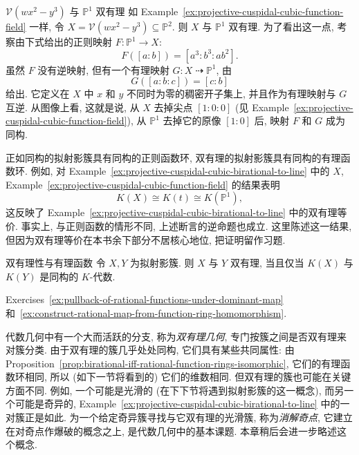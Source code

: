 \begin{Example}{$\mathcal{V}(wx^{2}-y^{3})$ 与 $\mathbb{P}^{1}$ 双有理}\leavevmode\label{ex:projective-cuspidal-cubic-birational-to-line}
如 Example~\ref{ex:projective-cuspidal-cubic-function-field} 一样, 令 $X=\mathcal{V}(wx^{2}-y^{3})\subseteq\mathbb{P}^{2}$. 则 $X$ 与 $\mathbb{P}^{1}$ 双有理. 为了看出这一点, 考察由下式给出的正则映射 $F:\mathbb{P}^{1}\to X$:
\[
  F([a:b])=[a^{3}:b^{3}:ab^{2}].
\]
虽然 $F$ 没有逆映射, 但有一个有理映射 $G:X\mathrel{\rightdasharrow}\mathbb{P}^{1}$, 由
\[
  G([a:b:c])=[c:b]
\]
给出. 它定义在 $X$ 中 $x$ 和 $y$ 不同时为零的稠密开子集上, 并且作为有理映射与 $G$ 互逆. 从图像上看, 这就是说, 从 $X$ 去掉尖点 $[1:0:0]$ (见 Example~\ref{ex:projective-cuspidal-cubic-function-field}), 从 $\mathbb{P}^{1}$ 去掉它的原像 $[1:0]$ 后, 映射 $F$ 和 $G$ 成为同构.
\end{Example}

正如同构的拟射影簇具有同构的正则函数环, 双有理的拟射影簇具有同构的有理函数环. 例如, 对 Example~\ref{ex:projective-cuspidal-cubic-birational-to-line} 中的 $X$, Example~\ref{ex:projective-cuspidal-cubic-function-field} 的结果表明
\[
  K(X)\cong K(t)\cong K(\mathbb{P}^{1}),
\]
这反映了 Example~\ref{ex:projective-cuspidal-cubic-birational-to-line} 中的双有理等价. 事实上, 与正则函数的情形不同, 上述断言的逆命题也成立. 这里陈述这一结果, 但因为双有理等价在本书余下部分不居核心地位, 把证明留作习题.

\begin{Proposition}{双有理性与有理函数}\leavevmode\label{prop:birational-iff-rational-function-rings-isomorphic}
令 $X,Y$ 为拟射影簇. 则 $X$ 与 $Y$ 双有理, 当且仅当 $K(X)$ 与 $K(Y)$ 是同构的 $K$-代数.
\end{Proposition}
\begin{Proof}
Exercises~\ref{ex:pullback-of-rational-functions-under-dominant-map} 和~\ref{ex:construct-rational-map-from-function-ring-homomorphism}.
\end{Proof}

代数几何中有一个大而活跃的分支, 称为\emph{双有理几何}, 专门按簇之间是否双有理来对簇分类. 由于双有理的簇\textquotedbl{}几乎处处\textquotedbl{}同构, 它们具有某些共同属性: 由 Proposition~\ref{prop:birational-iff-rational-function-rings-isomorphic}, 它们的有理函数环相同, 所以 (如下一节将看到的) 它们的维数相同. 但双有理的簇也可能在关键方面不同. 例如, 一个可能是光滑的 (在下下节将遇到拟射影簇的这一概念), 而另一个可能是奇异的, Example~\ref{ex:projective-cuspidal-cubic-birational-to-line} 中的一对簇正是如此. 为一个给定奇异簇寻找与它双有理的光滑簇, 称为\emph{消解奇点}, 它建立在对奇点作爆破的概念之上, 是代数几何中的基本课题. 本章稍后会进一步略述这个概念.

